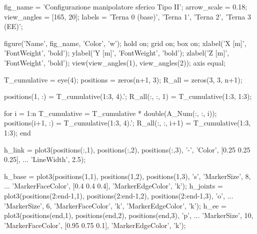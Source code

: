 \documentclass[11pt, a4paper]{article}
\begin{document}
\begin{matlabcode}
fig_name    = 'Configurazione manipolatore sferico Tipo II';
arrow_scale = 0.18;
view_angles = [165, 20];
labels      = {'Terna 0 (base)', 'Terna 1', 'Terna 2', 'Terna 3 (EE)'};

figure('Name', fig_name, 'Color', 'w');
hold on;
grid on;
box on;
xlabel('X [m]', 'FontWeight', 'bold');
ylabel('Y [m]', 'FontWeight', 'bold');
zlabel('Z [m]', 'FontWeight', 'bold');
view(view_angles(1), view_angles(2));
axis equal;

T_cumulative = eye(4);
positions = zeros(n+1, 3);
R_all     = zeros(3, 3, n+1);

positions(1, :) = T_cumulative(1:3, 4).';
R_all(:, :, 1)  = T_cumulative(1:3, 1:3);

for i = 1:n
    T_cumulative = T_cumulative * double(A_Num(:, :, i));
    positions(i+1, :) = T_cumulative(1:3, 4).';
    R_all(:, :, i+1)  = T_cumulative(1:3, 1:3);
end

h_link = plot3(positions(:,1), positions(:,2), positions(:,3), '-', 'Color', [0.25 0.25 0.25], ...
    'LineWidth', 2.5);

h_base = plot3(positions(1,1), positions(1,2), positions(1,3), 's', 'MarkerSize', 8, ...
    'MarkerFaceColor', [0.4 0.4 0.4], 'MarkerEdgeColor', 'k');
h_joints = plot3(positions(2:end-1,1), positions(2:end-1,2), positions(2:end-1,3), 'o', ...
    'MarkerSize', 6, 'MarkerFaceColor', 'k', 'MarkerEdgeColor', 'k');
h_ee = plot3(positions(end,1), positions(end,2), positions(end,3), 'p', ...
    'MarkerSize', 10, 'MarkerFaceColor', [0.95 0.75 0.1], 'MarkerEdgeColor', 'k');
\end{matlabcode}
\newpage
\end{document}
